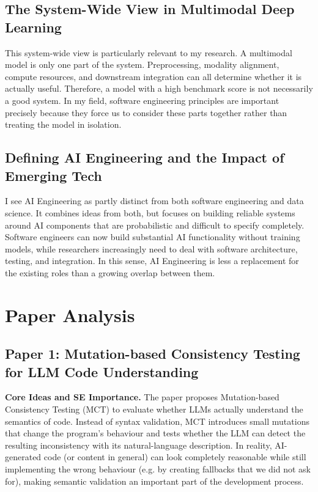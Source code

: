 \documentclass[11pt,a4paper]{article}
\begin{document}
\subsection{The System-Wide View in Multimodal Deep Learning}

This system-wide view is particularly relevant to my research. A multimodal model is only one part of the system. Preprocessing, modality alignment, compute resources, and downstream integration can all determine whether it is actually useful. Therefore, a model with a high benchmark score is not necessarily a good system. In my field, software engineering principles are important precisely because they force us to consider these parts together rather than treating the model in isolation.


\subsection{Defining AI Engineering and the Impact of Emerging Tech}

I see AI Engineering as partly distinct from both software engineering and data science. It combines ideas from both, but focuses on building reliable systems around AI components that are probabilistic and difficult to specify completely. Software engineers can now build substantial AI functionality without training models, while researchers increasingly need to deal with software architecture, testing, and integration. In this sense, AI Engineering is less a replacement for the existing roles than a growing overlap between them.



\section{Paper Analysis}

\subsection{Paper 1: Mutation-based Consistency Testing for LLM Code Understanding \cite{li24}}

\textbf{Core Ideas and SE Importance.} The paper proposes Mutation-based Consistency Testing (MCT) to evaluate whether LLMs actually understand the semantics of code. Instead of syntax validation, MCT introduces small mutations that change the program's behaviour and tests whether the LLM can detect the resulting inconsistency with its natural-language description. In reality, AI-generated code (or content in general) can look completely reasonable while still implementing the wrong behaviour (e.g. by creating fallbacks that we did not ask for), making semantic validation an important part of the development process.
\end{document}
